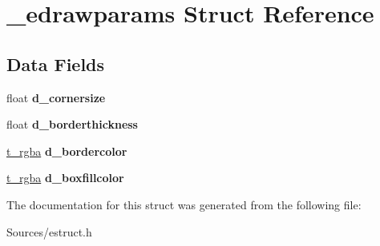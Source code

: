 \hypertarget{struct__edrawparams}{\section{\-\_\-edrawparams Struct Reference}
\label{struct__edrawparams}
}
\subsection*{Data Fields}
\begin{DoxyCompactItemize}
\item 
\hypertarget{struct__edrawparams_aabe78053b56e3bf3df55c7b85fa251b2}{float {\bfseries d\-\_\-cornersize}}\label{struct__edrawparams_aabe78053b56e3bf3df55c7b85fa251b2}

\item 
\hypertarget{struct__edrawparams_a9c360cb962f79a835ed0457d1dad34b5}{float {\bfseries d\-\_\-borderthickness}}\label{struct__edrawparams_a9c360cb962f79a835ed0457d1dad34b5}

\item 
\hypertarget{struct__edrawparams_af4ac3d463e5738bdbf0c2bbf15be9ae3}{\hyperlink{struct__rgba}{t\-\_\-rgba} {\bfseries d\-\_\-bordercolor}}\label{struct__edrawparams_af4ac3d463e5738bdbf0c2bbf15be9ae3}

\item 
\hypertarget{struct__edrawparams_aaf0259436a4f71d6659c0447e4b98e2b}{\hyperlink{struct__rgba}{t\-\_\-rgba} {\bfseries d\-\_\-boxfillcolor}}\label{struct__edrawparams_aaf0259436a4f71d6659c0447e4b98e2b}

\end{DoxyCompactItemize}


The documentation for this struct was generated from the following file\-:\begin{DoxyCompactItemize}
\item 
Sources/estruct.\-h\end{DoxyCompactItemize}
